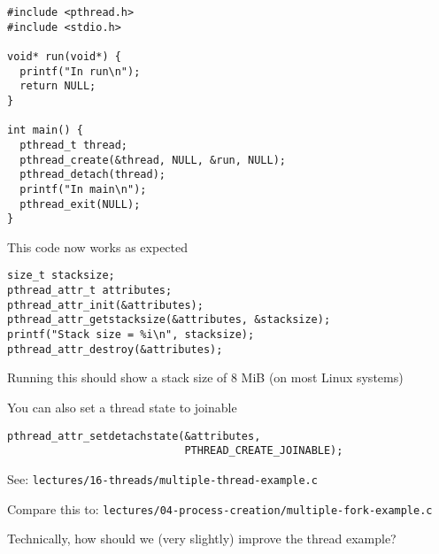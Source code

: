   \begin{slide}


    \begin{verbatim}
#include <pthread.h>
#include <stdio.h>

void* run(void*) {
  printf("In run\n");
  return NULL;
}

int main() {
  pthread_t thread;
  pthread_create(&thread, NULL, &run, NULL);
  pthread_detach(thread);
  printf("In main\n");
  pthread_exit(NULL);
}
    \end{verbatim}
    \medskip

    This code now works as expected

  \end{slide}

  \begin{slide}


    \begin{verbatim}
size_t stacksize;
pthread_attr_t attributes;
pthread_attr_init(&attributes);
pthread_attr_getstacksize(&attributes, &stacksize);
printf("Stack size = %i\n", stacksize);
pthread_attr_destroy(&attributes);
    \end{verbatim}

    Running this should show a stack size of 8 MiB (on most Linux systems)
    \medskip

    You can also set a thread state to joinable
    \medskip

    \begin{verbatim}
pthread_attr_setdetachstate(&attributes,
                            PTHREAD_CREATE_JOINABLE);
    \end{verbatim}

  \end{slide}

  \begin{slide}


    See: \texttt{lectures/16-threads/multiple-thread-example.c}
    \medskip

    Compare this to:
    \texttt{lectures/04-process-creation/multiple-fork-example.c}
    \medskip

    Technically, how should we (very slightly) improve the thread example?

  \end{slide}

